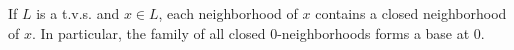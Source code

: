 If $L$ is a t.v.s. and $x \in L$, each neighborhood of $x$ contains a closed neighborhood of $x$. In particular, the family of all closed $0$-neighborhoods forms a base at $0$.
